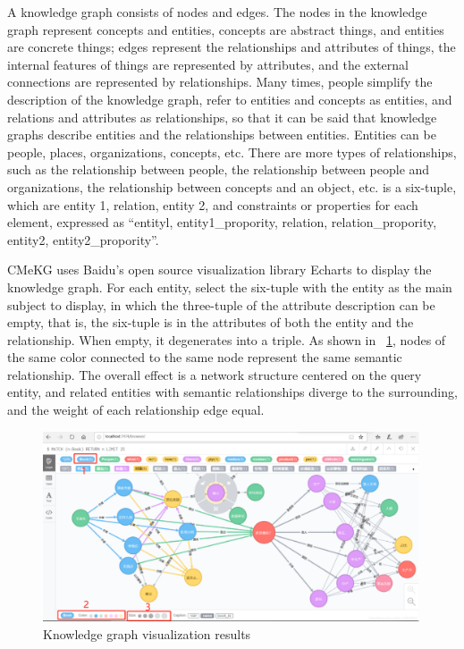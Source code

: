 A knowledge graph consists of nodes and edges. The nodes in the knowledge graph represent concepts and entities, concepts are abstract things, and entities are concrete things; edges represent the relationships and attributes of things, the internal features of things are represented by attributes, and the external connections are represented by relationships. Many times, people simplify the description of the knowledge graph, refer to entities and concepts as entities, and relations and attributes as relationships, so that it can be said that knowledge graphs describe entities and the relationships between entities. Entities can be people, places, organizations, concepts, etc. There are more types of relationships, such as the relationship between people, the relationship between people and organizations, the relationship between concepts and an object, etc. is a six-tuple, which are entity 1, relation, entity 2, and constraints or properties for each element, expressed as {“entityl, entity1\_propority, relation, relation\_propority, entity2, entity2\_propority”}.

CMeKG uses Baidu's open source visualization library Echarts to display the knowledge graph. For each entity, select the six-tuple with the entity as the main subject to display, in which the three-tuple of the attribute description can be empty, that is, the six-tuple is in the attributes of both the entity and the relationship. When empty, it degenerates into a triple. As shown in ~\ref{fig:frog1}, nodes of the same color connected to the same node represent the same semantic relationship. The overall effect is a network structure centered on the query entity, and related entities with semantic relationships diverge to the surrounding, and the weight of each relationship edge equal.

\begin{figure}[ht]
\centering
\includegraphics[width=1\textwidth]{images/3.3.1.png}
\caption{\label{fig:frog1}Knowledge graph visualization results}
\end{figure}


